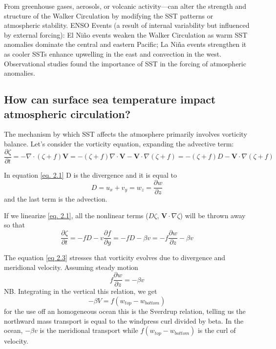 From greenhouse gases, aerosols, or volcanic activity—can alter the strength and structure of the Walker Circulation by modifying the SST patterns or atmospheric stability.
ENSO Events (a result of internal variability but influenced by external forcing): El Niño events weaken the Walker Circulation as warm SST anomalies dominate the central and eastern Pacific; La Niña events strengthen it as cooler SSTs enhance upwelling in the east and convection in the west.
Observational studies found the importance of SST in the forcing of atmospheric anomalies.


\subsection{How can surface sea temperature impact atmospheric circulation?}
The mechanism by which SST affects the atmosphere primarily involves vorticity balance.
Let's consider the vorticity equation, expanding the advective term:
\begin{equation}\label{eq. 2.1}
	\frac{\partial \zeta}{\partial t} = - \nabla \cdot (\zeta + f) \mathbf{V} = - (\zeta + f) \nabla \cdot \mathbf{V} - \mathbf{V} \cdot \nabla (\zeta + f) = - (\zeta + f) D - \mathbf{V} \cdot \nabla (\zeta + f)
\end{equation}

In equation \ref{eq. 2.1} D is the divergence and it is equal to
\begin{equation}
	D=u_x + v_y = w_z = \frac{\partial w}{\partial z}
\end{equation}
and the last term is the advection.


If we linearize \ref{eq. 2.1}, all the nonlinear terms ($D\zeta$, $\mathbf{V}\cdot\nabla\zeta$) will be thrown away so that
\begin{equation}\label{eq 2.3}
	\frac{\partial \zeta}{\partial t} = - f D - v \frac{\partial f}{\partial y} = - f D - \beta v=- f \frac{\partial w}{\partial z} - \beta v
\end{equation}

The equation \ref{eq 2.3} stresses that vorticity evolves due to divergence and meridional velocity.
Assuming steady motion
\begin{equation}
	f \frac{\partial w}{\partial z} = -\beta v
\end{equation}
NB. Integrating in the vertical this relation, we get $$-\beta V=f(w_{top}-w_{bottom})$$
for the use off an homogeneous ocean this is the Sverdrup relation, telling us the northward mass transport is equal to the windpress curl divided by beta. In the ocean, $-\beta v$ is the meridional transport while $f(w_{top}-w_{bottom})$ is the curl of velocity.\\



